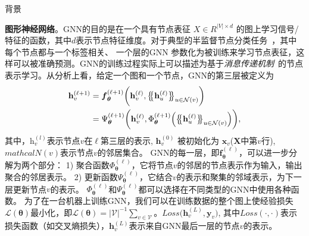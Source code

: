 \begin{section}{背景}


    \textbf{图形神经网络}。GNN的目的是在一个具有节点表征
    $\textit{X}\in\textit{R}^{\vert\textit{V}\vert\times d}$
    的图上学习信号/特征的函数，其中$d$表示节点特征维度。对于典型的半监督节点分类任务~\cite{kipf2016semi}，其中每个节点都与一个标签相关、 一个层的GNN 参数化为被训练来学习节点表征，这样可以被准确预测。GNN的训练过程实际上可以描述为基于\textit{消息传递机制}~\cite{gilmer2017neural}的节点表示学习。从分析上看，给定一个图和一个节点，GNN的第三层被定义为
    \begin{equation}
        \label{eq:gnn}
        \vspace{-1mm}
        \begin{split}
            \mathbf{h}_{v}^{(\ell+1)} &= \boldsymbol{f}_{\boldsymbol{\theta}}^{(\ell+1)} \bigg(\mathbf{h}_{v}^{(\ell)}, \big\{\!\!\big\{ \mathbf{h}^{(\ell)}_u  \big\}\!\!\big\}_{u \in \mathcal{N}(v)} \bigg) \\
            &= \Psi^{(\ell+1)}_{\boldsymbol{\theta}}\bigg( \mathbf{h}_{v}^{(\ell)},  \Phi^{(\ell+1)}_{\boldsymbol{\theta}}\Big(\big\{\!\!\big\{\mathbf{h}^{(\ell)}_u  \big\}\!\!\big\}_{u \in \mathcal{N}(v)}\Big) \bigg),
        \end{split}
        \vspace{-2mm}
        \end{equation}
    其中，$\textit{h}_{v}^{(\textit{l})}$表示节点$v$在$\ell$第三层的表示, $\textbf{h}^{(0)}_{v}$ 被初始化为 $\textbf{x}_{v}$($\textbf{X}$中第$v$行), $mathcal{N}(v)$表示节点$v$的邻居集合。
    GNN的每一层，即$\boldsymbol{f}_{\boldsymbol{\theta}}^{(\ell)}$，可以进一步分解为两个部分：
    1) 聚合函数$\Phi^{(\ell)}_{\boldsymbol{\theta}}$，它将节点$v$的邻居的节点表示作为输入，输出聚合的邻居表示。
    2) 更新函数$\Psi^{(\ell)}_{\boldsymbol{\theta}}$，它结合$v$的表示和聚集的邻域表示，为下一层更新节点$v$的表示。
    $\Phi^{(\ell)}_{\boldsymbol{\theta}}$和$\Psi^{(\ell)}_{\boldsymbol{\theta}}$都可以选择在不同类型的GNN中使用各种函数。
    为了在一台机器上训练GNN，我们可以在训练数据的整个图上使经验损失$\mathcal{L}(\boldsymbol{\theta})$最小化，即$\mathcal{L}(\boldsymbol{\theta}) = \vert\mathcal{V}\vert^{-1}\sum\nolimits_{v\in\mathcal{V}}。Loss\big(\mathbf{h}_{v}^{(L)},\mathbf{y}_{v}\big)$,
    其中$Loss(\cdot,\cdot)$表示损失函数（如交叉熵损失），$\mathbf{h}_{v}^{(L)}$表示来自GNN最后一层的节点$v$的表示。



\end{section}
